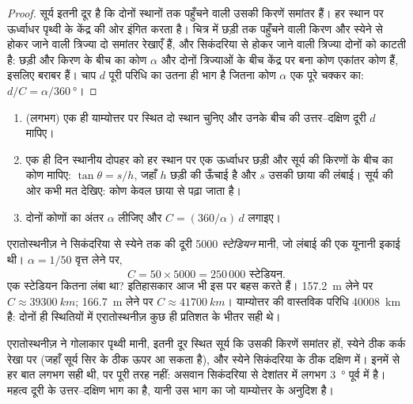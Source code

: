 \begin{proof}
सूर्य इतनी दूर है कि दोनों स्थानों तक पहुँचने वाली उसकी किरणें समांतर हैं। हर स्थान पर
ऊर्ध्वाधर पृथ्वी के केंद्र की ओर इंगित करता है। चित्र में छड़ी तक पहुँचने वाली किरण और
स्येने से होकर जाने वाली त्रिज्या दो समांतर रेखाएँ हैं, और सिकंदरिया से होकर जाने वाली
त्रिज्या दोनों को काटती है: छड़ी और किरण के बीच का कोण
$\alpha$ और दोनों त्रिज्याओं के बीच केंद्र पर बना कोण एकांतर कोण हैं, इसलिए बराबर हैं।
चाप $d$ पूरी परिधि का उतना ही भाग है जितना कोण $\alpha$ एक पूरे
चक्कर का: $d/C = \alpha/\qty{360}{\degree}$।
\end{proof}

\begin{method}[दो छायाओं से परिधि मापना]\label{met:g10:measuring-the-earth:shadows}
\begin{enumerate}
  \item (लगभग) एक ही याम्योत्तर पर स्थित दो स्थान चुनिए और उनके बीच की उत्तर--दक्षिण
        दूरी $d$ मापिए।
  \item एक ही दिन स्थानीय दोपहर को हर स्थान पर एक ऊर्ध्वाधर छड़ी और सूर्य की किरणों के
        बीच का कोण मापिए: $\tan \theta = s/h$,
        जहाँ $h$ छड़ी की ऊँचाई है और $s$ उसकी छाया की लंबाई। सूर्य की ओर
        कभी मत देखिए: कोण केवल छाया से पढ़ा जाता है।
  \item दोनों कोणों का अंतर $\alpha$ लीजिए और
        $C = (360/\alpha)\,d$ लगाइए।
\end{enumerate}
\end{method}

\begin{example}[एरातोस्थनीज़ की संख्याएँ]\label{ex:g10:measuring-the-earth:numbers}
एरातोस्थनीज़ ने सिकंदरिया से स्येने तक की दूरी 5000
\emph{स्टेडियन} मानी, जो लंबाई की एक यूनानी इकाई थी। $\alpha = 1/50$ वृत्त लेने पर,
\[
  C = 50 \times 5000 = 250\,000 \text{ स्टेडियन}.
\]
एक स्टेडियन कितना लंबा था? इतिहासकार आज भी इस पर बहस करते हैं।
\qty{157.2}{m} लेने पर $C \approx \qty{39300}{km}$; \qty{166.7}{m} लेने पर
$C \approx \qty{41700}{km}$। याम्योत्तर की वास्तविक परिधि
\qty{40008}{km} है: दोनों ही स्थितियों में एरातोस्थनीज़ कुछ ही प्रतिशत के भीतर सही थे।
\end{example}

\begin{remark}[क्या मान लिया गया था]\label{rem:g10:measuring-the-earth:assumptions}
एरातोस्थनीज़ ने गोलाकार पृथ्वी मानी, इतनी दूर स्थित सूर्य कि उसकी किरणें समांतर हों,
स्येने ठीक कर्क रेखा पर (जहाँ सूर्य सिर के ठीक ऊपर आ सकता है), और स्येने सिकंदरिया के ठीक
दक्षिण में। इनमें से हर बात लगभग सही थी, पर पूरी तरह नहीं: असवान सिकंदरिया से देशांतर में
लगभग \qty{3}{\degree} पूर्व में है। महत्व दूरी के उत्तर--दक्षिण भाग का है, यानी उस भाग का जो
याम्योत्तर के अनुदिश है।
\end{remark}

